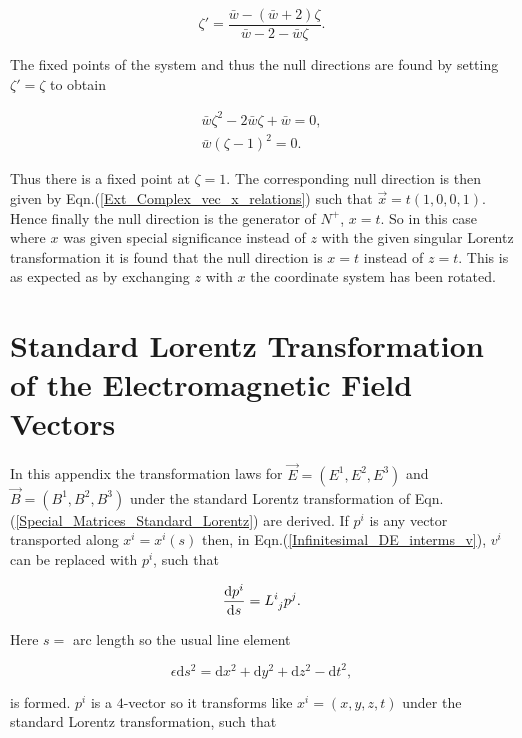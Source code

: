 \begin{appendix}
\begin{equation*}
\zeta' = \frac{\bar{w} - (\bar{w} +2)\zeta}{\bar{w} -2 - \bar{w}\zeta}. 
\end{equation*}

\noindent The fixed points of the system and thus the null directions are found by setting $\zeta' = \zeta$ to obtain

\begin{gather*}
\bar{w} \zeta^2 - 2 \bar{w} \zeta + \bar{w} = 0,\\
\bar{w}(\zeta-1)^2 = 0.
\end{gather*}

\noindent Thus there is a fixed point at $\zeta = 1$. The corresponding null direction is then given by Eqn.(\ref{Ext_Complex_vec_x_relations}) such that $\vec{x}= t(1,0,0,1)$. Hence finally the null direction is the generator of $N^+$, $x=t$. So in this case where $x$ was given special significance instead of $z$ with the given singular Lorentz transformation it is found that the null direction is $x=t$ instead of $z=t$. This is as expected as by exchanging $z$ with $x$ the coordinate system has been rotated. 

\section{Standard Lorentz Transformation of the Electromagnetic Field Vectors}\label{Appendix_Standard_Transform_EM_Vectors}

In this appendix the transformation laws for $\vec{E} = (E^1, E^2, E^3)$ and $\vec{B} = (B^1, B^2, B^3)$ under the standard Lorentz transformation of Eqn.(\ref{Special_Matrices_Standard_Lorentz}) are derived. If $p^i$ is any vector transported along $x^i = x^i (s)$ then, in Eqn.(\ref{Infinitesimal_DE_interms_v}), $v^i$ can be replaced with $p^i$, such that

\begin{equation*} 
\frac{\mathrm{d}p^i}{\mathrm{d}s} = \tensor{L}{^i_j} p^j.
\end{equation*} 

\noindent Here $s =$ arc length so the usual line element

\begin{equation*} 
\epsilon \mathrm{d}s^2 = \mathrm{d}x^2 + \mathrm{d}y^2 + \mathrm{d}z^2 - \mathrm{d}t^2,
\end{equation*} 

\noindent is formed. $p^i$ is a $4$-vector so it transforms like $x^i = (x,y,z,t)$ under the standard Lorentz transformation, such that


\end{appendix}
